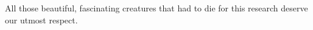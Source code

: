 
All those beautiful, fascinating creatures that had to die for this research deserve our utmost respect.
